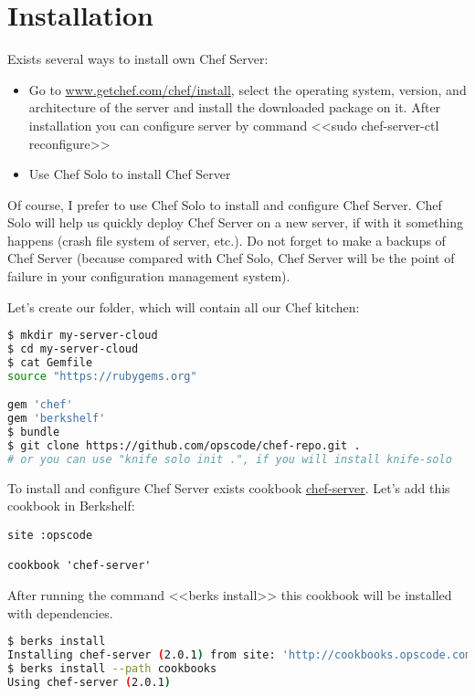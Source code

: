 \section{Installation}
\label{sec:server-installation}

Exists several ways to install own Chef Server:

\begin{itemize}
  \item Go to \href{http://www.getchef.com/chef/install/}{www.getchef.com/chef/install}, select the operating system, version, and architecture of the server and install the downloaded package on it. After installation you can configure server by command <<sudo chef-server-ctl reconfigure>>
  \item Use Chef Solo to install Chef Server
\end{itemize}

Of course, I prefer to use Chef Solo to install and configure Chef Server. Chef Solo will help us quickly deploy Chef Server on a new server, if with it something happens (crash file system of server, etc.). Do not forget to make a backups of Chef Server (because compared with Chef Solo, Chef Server will be the point of failure in your configuration management system).

Let's create our folder, which will contain all our Chef kitchen:

\begin{lstlisting}[language=Bash,label=lst:my-server-cloud-installation1]
$ mkdir my-server-cloud
$ cd my-server-cloud
$ cat Gemfile
source "https://rubygems.org"

gem 'chef'
gem 'berkshelf'
$ bundle
$ git clone https://github.com/opscode/chef-repo.git .
# or you can use "knife solo init .", if you will install knife-solo
\end{lstlisting}

To install and configure Chef Server exists cookbook \href{http://community.opscode.com/cookbooks/chef-server}{chef-server}. Let's add this cookbook in Berkshelf:

\begin{lstlisting}[label=lst:my-server-cloud-installation2,title=my-server-cloud/Berkshelf]
site :opscode

cookbook 'chef-server'
\end{lstlisting}

After running the command <<berks install>> this cookbook will be installed with dependencies.

\begin{lstlisting}[language=Bash,label=lst:my-server-cloud-installation3]
$ berks install
Installing chef-server (2.0.1) from site: 'http://cookbooks.opscode.com/api/v1/cookbooks'
$ berks install --path cookbooks
Using chef-server (2.0.1)
\end{lstlisting}

